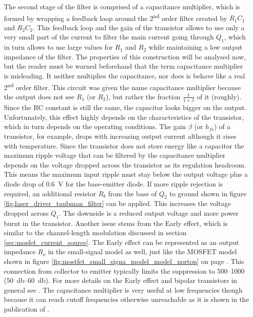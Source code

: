 The second stage of the filter is comprised of a capacitance multiplier, which is formed by wrapping a feedback loop around the 2\textsuperscript{nd} order filter created by $R_1 C_1$ and $R_2 C_2$. This feedback loop and the gain of the transistor allows to use only a very small part of the current to filter the main current going through $Q_1$, which in turn allows to use large values for $R_1$ and $R_2$ while maintaining a low output impedance of the filter. The properties of this construction will be analysed now, but the reader must be warned beforehand that the term capacitance multiplier is misleading. It neither multiplies the capacitance, nor does is behave like a real 2\textsuperscript{nd} order filter. This circuit was given the name capacitance multiplier because the output does not see $R_1$ (or $R_2$), but rather the fraction $\frac{1}{1+\beta}$ of it (roughly). Since the RC constant is still the same, the capacitor looks bigger on the output. Unfortunately, this effect highly depends on the characteristics of the transistor, which in turn depends on the operating conditions. The gain $\beta$ (or $h_{fe}$) of a transistor, for example, drops with increasing output current although it rises with temperature. Since the transistor does not store energy like a capacitor the maximum ripple voltage that can be filtered by the capacitance multiplier depends on the voltage dropped across the transistor as its regulation headroom. This means the maximum input ripple must stay below the output voltage plus a diode drop of \qty{0.6}{\V} for the base-emitter diode. If more ripple rejection is required, an additional resistor $R_b$ from the base of $Q_2$ to ground shown in figure \ref{fig:laser_driver_taubman_filter} can be applied. This increases the voltage dropped across $Q_1$. The downside is a reduced output voltage and more power burnt in the transistor. Another issue stems from the Early effect, which is similar to the channel-length modulation discussed in section \ref{sec:mosfet_current_source}. The Early effect can be represented as an output impedance $R_o$ in the small-signal model as well, just like the MOSFET model shown in figure \ref{fig:mostfet_small_signa_model_model_norton} on page \pageref{fig:mostfet_small_signa_model_model_norton}. This connection from collector to emitter typically limits the suppression to \numrange{500}{1000} (\qtyrange[range-phrase={~to~}]{50}{60}{\decibel}). For more details on the Early effect and bipolar transistors in general see \cite{transistor_bible,fet_equations}. The capacitance multiplier is very useful at low frequencies though because it can reach cutoff frequencies otherwise unreachable as it is shown in the publication of \citeauthor{laser_driver_qcl_taubman} \cite{laser_driver_qcl_taubman}.

